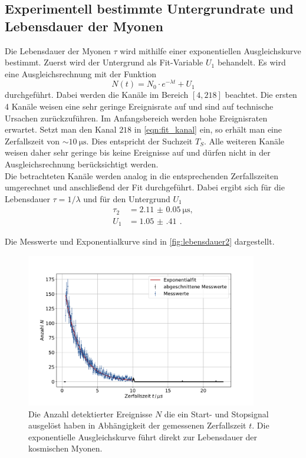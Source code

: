 \FloatBarrier

\subsection{Experimentell bestimmte Untergrundrate und Lebensdauer der Myonen}
Die Lebensdauer der Myonen $\tau$ wird mithilfe einer exponentiellen Ausgleichskurve bestimmt.
Zuerst wird der Untergrund als Fit-Variable $U_1$ behandelt.
Es wird eine Ausgleichsrechnung mit der Funktion
\begin{equation}
    N(t) = N_0 \cdot e^{- \lambda t} + U_1
\end{equation}
durchgeführt.
Dabei werden die Kanäle im Bereich $[4, 218]$ beachtet.
Die ersten 4 Kanäle weisen eine sehr geringe Ereignisrate auf und sind auf technische Ursachen zurückzuführen.
Im Anfangsbereich werden hohe Ereignisraten erwartet.
Setzt man den Kanal $218$ in \autoref{eqn:fit_kanal} ein, so erhält man eine Zerfallszeit von $\sim \qty{10}{\micro\second}$.
Dies entspricht der Suchzeit $T_S$.
Alle weiteren Kanäle weisen daher sehr geringe bis keine Ereignisse auf und dürfen nicht in der Ausgleichsrechnung berücksichtigt werden.
\\
Die betrachteten Kanäle werden analog in die entsprechenden Zerfallszeiten umgerechnet und anschließend der Fit durchgeführt.
Dabei ergibt sich für die Lebensdauer $\tau = 1/\lambda$ und für den Untergrund $U_1$
\begin{align}
    \tau_2 &= \qty{2.11(5)}{\micro\second},\\
    U_1 &= \qty{1.05(41)}{} \,.
\end{align}

Die Messwerte und Exponentialkurve sind in \autoref{fig:lebensdauer2} dargestellt.

\begin{figure}
    \centering
    \includegraphics[width=0.9\textwidth]{content/plots/lifetime.pdf}
    \caption{Die Anzahl detektierter Ereignisse $N$ die ein Start- und Stopsignal ausgelöst haben in Abhängigkeit der gemessenen Zerfallszeit $t$.
    Die exponentielle Ausgleichskurve führt direkt zur Lebensdauer der kosmischen Myonen.
    }
    \label{fig:lebensdauer2}
\end{figure}
